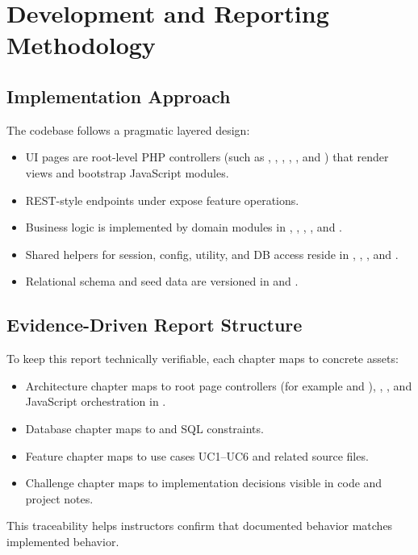 \section{Development and Reporting Methodology}

\subsection{Implementation Approach}

The codebase follows a pragmatic layered design:
\begin{itemize}
    \item UI pages are root-level PHP controllers (such as , , , , , and ) that render views and bootstrap JavaScript modules.
    \item REST-style endpoints under  expose feature operations.
    \item Business logic is implemented by domain modules in , , , , and .
    \item Shared helpers for session, config, utility, and DB access reside in , , , and .
    \item Relational schema and seed data are versioned in  and .
\end{itemize}

\subsection{Evidence-Driven Report Structure}

To keep this report technically verifiable, each chapter maps to concrete assets:
\begin{itemize}
    \item Architecture chapter maps to root page controllers (for example  and ), , , and JavaScript orchestration in .
    \item Database chapter maps to  and SQL constraints.
    \item Feature chapter maps to use cases UC1--UC6 and related source files.
    \item Challenge chapter maps to implementation decisions visible in code and project notes.
\end{itemize}

This traceability helps instructors confirm that documented behavior matches implemented behavior.
